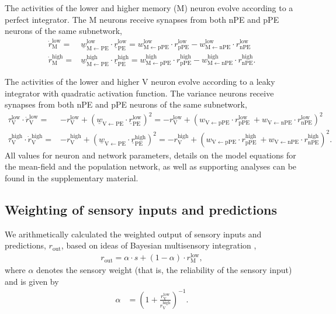 \documentclass[10pt,a4paper]{article}
\begin{document}
The activities of the lower and higher memory (M) neuron evolve according to a perfect integrator. The M neurons receive synapses from both nPE and pPE neurons of the same subnetwork,
%
\begin{align}
\dot{r}_\mathrm{M}^\mathrm{low} =& \underline{w}_\mathrm{M \leftarrow PE}^\mathrm{low} \cdot \underline{r}_\mathrm{PE}^\mathrm{low} = w_\mathrm{M \leftarrow pPE}^\mathrm{low} \cdot r_\mathrm{pPE}^\mathrm{low} - w_\mathrm{M \leftarrow nPE}^\mathrm{low} \cdot r_\mathrm{nPE}^\mathrm{low} \nonumber \\
%
\dot{r}_\mathrm{M}^\mathrm{high} =& \underline{w}_\mathrm{M \leftarrow PE} ^\mathrm{high} \cdot \underline{r}_\mathrm{PE}^\mathrm{high} = w_\mathrm{M \leftarrow pPE}^\mathrm{high}  \cdot r_\mathrm{pPE}^\mathrm{high} - w_\mathrm{M \leftarrow nPE}^\mathrm{high}  \cdot r_\mathrm{nPE}^\mathrm{high} .
\end{align}
%

The activities of the lower and higher V neuron evolve according to a leaky integrator with quadratic activation function. The variance neurons receive synapses from both nPE and pPE neurons of the same subnetwork,
%
\begin{align}
\tau_\mathrm{V}^\mathrm{low} \cdot \dot{r}_\mathrm{V}^\mathrm{low} =& - r_\mathrm{V}^\mathrm{low} + \left( \underline{w}_\mathrm{V \leftarrow PE} \cdot \underline{r}_\mathrm{PE}^\mathrm{low}\right)^2 = - r_\mathrm{V}^\mathrm{low} + \left( w_\mathrm{V \leftarrow pPE} \cdot r_\mathrm{pPE}^\mathrm{low}\ + w_\mathrm{V \leftarrow nPE} \cdot r_\mathrm{nPE}^\mathrm{low}\right)^2 \nonumber\\
%
\tau_\mathrm{V}^\mathrm{high} \cdot \dot{r}_\mathrm{V}^\mathrm{high} =& - r_\mathrm{V}^\mathrm{high} + \left( \underline{w}_\mathrm{V \leftarrow PE} \cdot \underline{r}_\mathrm{PE}^\mathrm{high}\right)^2 = - r_\mathrm{V}^\mathrm{high} + \left( w_\mathrm{V \leftarrow pPE} \cdot r_\mathrm{pPE}^\mathrm{high}\ + w_\mathrm{V \leftarrow nPE} \cdot r_\mathrm{nPE}^\mathrm{high}\right)^2.
\end{align} 
%
All values for neuron and network parameters, details on the model equations for the mean-field and the population network, as well as supporting analyses can be found in the supplementary material.

\subsection*{Weighting of sensory inputs and predictions}
%
We arithmetically calculated the weighted output of sensory inputs and predictions, $r_\mathrm{out}$, based on ideas of Bayesian multisensory integration \citep[see, e.g.][]{pouget2013probabilistic},
%
\begin{align}
r_\mathrm{out} = \alpha \cdot s + (1-\alpha) \cdot r_\mathrm{M}^\mathrm{low},
\end{align}
%
where $\alpha$ denotes the sensory weight (that is, the reliability of the sensory input) and is given by 
%
\begin{align}
\alpha &= \left( 1 + \frac{r_\mathrm{V}^\mathrm{low}}{r_\mathrm{V}^\mathrm{high}} \right)^{-1}.
\end{align}
\end{document}
